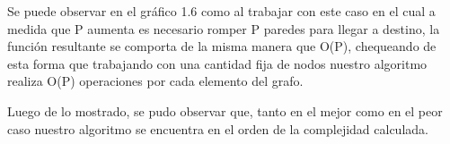 Se puede observar en el gr\'afico 1.6 como al trabajar con este caso en el cual a medida que P aumenta es necesario romper P paredes para llegar a destino, la funci\'on resultante se comporta de la misma manera que O(P), chequeando de esta forma que trabajando con una cantidad fija de nodos nuestro algoritmo realiza O(P) operaciones por cada elemento del grafo.

Luego de lo mostrado, se pudo observar que, tanto en el mejor como en el peor caso nuestro algoritmo se encuentra en el orden de la complejidad calculada.